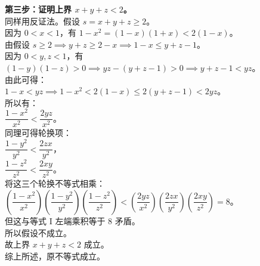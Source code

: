 {  \textbf{第三步：证明上界 \(x + y + z < 2\)。}\\
  同样用反证法。假设 \(s = x + y + z \geqslant 2\)。\\
  因为 \(0 < x < 1\)，有 \(1 - x^2 = (1 - x)(1 + x) < 2(1 - x)\)。\\
  由假设 \(s \geqslant 2 \implies y + z \geqslant 2 - x \implies 1 - x \leqslant y + z - 1\)。\\
  因为 \(0 < y, z < 1\)，有 \((1 - y)(1 - z) > 0 \implies yz - (y + z - 1) > 0 \implies y + z - 1 < yz\)。\\
  由此可得：\\
  \(1 - x < yz \implies 1 - x^2 < 2(1 - x) \leqslant 2(y + z - 1) < 2yz\)。\\
  所以有：\\
  \(\dfrac{1 - x^2}{x^2} < \dfrac{2yz}{x^2}\)。\\
  同理可得轮换项：\\
  \(\dfrac{1 - y^2}{y^2} < \dfrac{2zx}{y^2}\)，\\
  \(\dfrac{1 - z^2}{z^2} < \dfrac{2xy}{z^2}\)。\\
  将这三个轮换不等式相乘：\\
  \(\left(\dfrac{1 - x^2}{x^2}\right)\left(\dfrac{1 - y^2}{y^2}\right)\left(\dfrac{1 - z^2}{z^2}\right) < \left(\dfrac{2yz}{x^2}\right)\left(\dfrac{2zx}{y^2}\right)\left(\dfrac{2xy}{z^2}\right) = 8\)。\\
  但这与等式 I 左端乘积等于 8 矛盾。\\
  所以假设不成立。\\
  故上界 \(x + y + z < 2\) 成立。\\
  综上所述，原不等式成立。%
}

